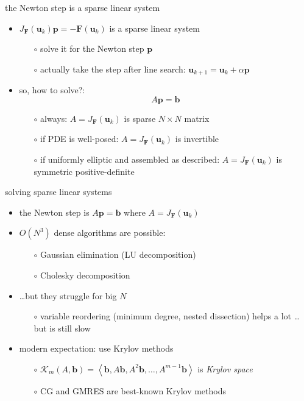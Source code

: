 \documentclass[hide notes,intlimits,usenames,dvipsnames]{beamer}
\newcommand{\bF}{\mathbf{F}}
\newcommand{\bb}{\mathbf{b}}
\newcommand{\bp}{\mathbf{p}}
\newcommand{\bu}{\mathbf{u}}
\begin{document}
\begin{frame}{the Newton step is a sparse linear system}
\begin{itemize}
\item $J_\bF(\bu_k) \bp = - \bF(\bu_k)$ is a sparse linear system
    \begin{itemize}
    \item[$\circ$] solve it for the Newton step $\bp$
    \item[$\circ$] actually take the step after line search: $\bu_{k+1} = \bu_k + \alpha\bp$
    \end{itemize}

\item so, how to solve?:
    $$A \bp = \bb$$

\vspace{-3mm}
    \begin{itemize}
    \item[$\circ$] always: $A=J_\bF(\bu_k)$ is sparse $N\times N$ matrix
    \item[$\circ$] if PDE is well-posed: $A=J_\bF(\bu_k)$ is invertible
    \item[$\circ$] if uniformly elliptic and assembled as described: $A=J_\bF(\bu_k)$ is symmetric positive-definite
    \end{itemize}
\end{itemize}
\end{frame}


\begin{frame}{solving sparse linear systems}
\begin{itemize}
\item the Newton step is $A \bp = \bb$ where $A=J_\bF(\bu_k)$
\item $O(N^3)$ dense algorithms are possible:
    \begin{itemize}
    \item[$\circ$] Gaussian elimination (LU decomposition)
    \item[$\circ$] Cholesky decomposition
    \end{itemize}
\item \dots but they struggle for big $N$
    \begin{itemize}
    \item[$\circ$] variable reordering (minimum degree, nested dissection) helps a lot \dots but is still slow
    \end{itemize}
\item modern expectation: use Krylov methods
    \begin{itemize}
    \item[$\circ$] $\mathcal{K}_m(A,\bb) = \left<\bb,A\bb,A^2\bb,\dots,A^{m-1}\bb\right>$ is \emph{Krylov space}
    \item[$\circ$] CG and GMRES are best-known Krylov methods
    \end{itemize}
\end{itemize}
\end{frame}
\end{document}
